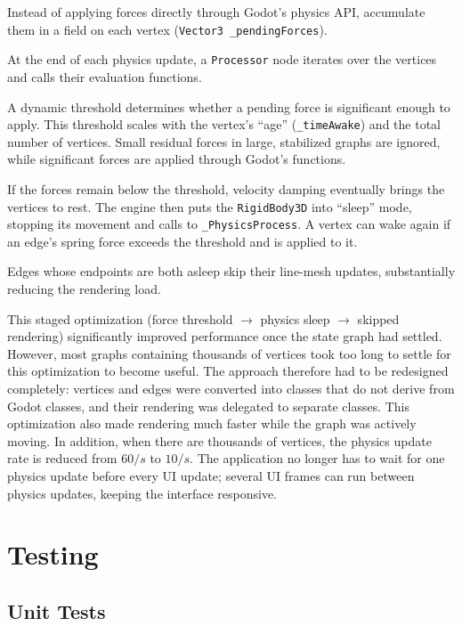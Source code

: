 \begin{compactenum}
\item Instead of applying forces directly through Godot's physics API, accumulate them in a field on each vertex (\texttt{Vector3 \_pendingForces}).
\item At the end of each physics update, a \texttt{Processor} node iterates over the vertices and calls their evaluation functions.
\item A dynamic threshold determines whether a pending force is significant enough to apply. This threshold scales with the vertex's \enquote{age} (\texttt{\_timeAwake}) and the total number of vertices. Small residual forces in large, stabilized graphs are ignored, while significant forces are applied through Godot's functions.
\item If the forces remain below the threshold, velocity damping eventually brings the vertices to rest. The engine then puts the \texttt{RigidBody3D} into \enquote{sleep} mode, stopping its movement and calls to \texttt{\_PhysicsProcess}. A vertex can wake again if an edge's spring force exceeds the threshold and is applied to it.
\item Edges whose endpoints are both asleep skip their line-mesh updates, substantially reducing the rendering load.
\end{compactenum}

This staged optimization (force threshold $\to$ physics sleep $\to$ skipped rendering) significantly improved performance once the state graph had settled. However, most graphs containing thousands of vertices took too long to settle for this optimization to become useful. The approach therefore had to be redesigned completely: vertices and edges were converted into classes that do not derive from Godot classes, and their rendering was delegated to separate classes. This optimization also made rendering much faster while the graph was actively moving. In addition, when there are thousands of vertices, the physics update rate is reduced from $60/s$ to $10/s$. The application no longer has to wait for one physics update before every UI update; several UI frames can run between physics updates, keeping the interface responsive.

\section{Testing}

\subsection{Unit Tests}

